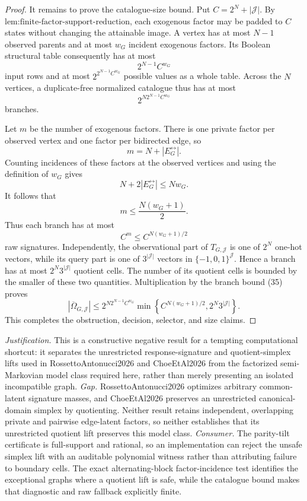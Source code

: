 \documentclass{article}
\begin{document}
\begin{proof}
It remains to prove the catalogue-size bound.  Put \(C=2^N+|\mathcal J|\).  By \(\text{lem:finite-factor-support-reduction}\), each exogenous factor may be padded to \(C\) states without changing the attainable image.  A vertex has at most \(N-1\) observed parents and at most \(w_G\) incident exogenous factors.  Its Boolean structural table consequently has at most
\[
2^{N-1}C^{w_G}
\]
input rows and at most \(2^{2^{N-1}C^{w_G}}\) possible values as a whole table.  Across the \(N\) vertices, a duplicate-free normalized catalogue thus has at most
\[
2^{N2^{N-1}C^{w_G}}
\tag{35}
\]
branches.

Let \(m\) be the number of exogenous factors.  There is one private factor per observed vertex and one factor per bidirected edge, so
\[
m=N+|E_G^{\leftrightarrow}|.
\]
Counting incidences of these factors at the observed vertices and using the definition of \(w_G\) gives
\[
N+2|E_G^{\leftrightarrow}|\le Nw_G.
\]
It follows that
\[
m\le\frac{N(w_G+1)}2.
\tag{36}
\]
Thus each branch has at most
\[
C^m\le C^{N(w_G+1)/2}
\]
raw signatures.  Independently, the observational part of \(T_{G,\mathcal J}\) is one of \(2^N\) one-hot vectors, while its query part is one of \(3^{|\mathcal J|}\) vectors in \(\{-1,0,1\}^{\mathcal J}\).  Hence a branch has at most \(2^N3^{|\mathcal J|}\) quotient cells.  The number of its quotient cells is bounded by the smaller of these two quantities.  Multiplication by the branch bound (35) proves
\[
|\overline\Omega_{G,\mathcal J}|
\le
2^{N2^{N-1}C^{w_G}}
\min\left\{C^{N(w_G+1)/2},2^N3^{|\mathcal J|}\right\}.
\]
This completes the obstruction, decision, selector, and size claims.
\end{proof}
\par\smallskip\noindent \textit{Justification.} This is a constructive negative result for a tempting computational shortcut: it separates the unrestricted response-signature and quotient-simplex lifts used in RossettoAntonucci2026 and ChoeEtAl2026 from the factorized semi-Markovian model class required here, rather than merely presenting an isolated incompatible graph. \textit{Gap.} RossettoAntonucci2026 optimizes arbitrary common-latent signature masses, and ChoeEtAl2026 preserves an unrestricted canonical-domain simplex by quotienting. Neither result retains independent, overlapping private and pairwise edge-latent factors, so neither establishes that its unrestricted quotient lift preserves this model class. \textit{Consumer.} The parity-tilt certificate is full-support and rational, so an implementation can reject the unsafe simplex lift with an auditable polynomial witness rather than attributing failure to boundary cells. The exact alternating-block factor-incidence test identifies the exceptional graphs where a quotient lift is safe, while the catalogue bound makes that diagnostic and raw fallback explicitly finite.
\end{document}
